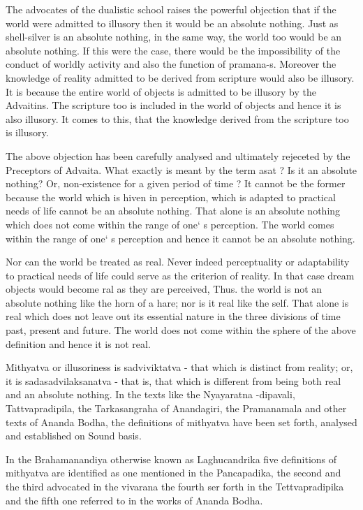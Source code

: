 The advocates of the dualistic school raises the powerful objection that if the world were admitted to illusory then it would be an absolute nothing. Just as shell-silver is an absolute nothing, in the same way, the world too would be an absolute nothing. If this were the case, there would be the impossibility of the conduct of worldly activity and also the function of pramana-s. Moreover the knowledge of reality admitted to be derived from scripture would also be illusory. It is because the entire world of objects is admitted to be illusory by the Advaitins. The scripture too is included in the world of objects and hence it is also illusory. It comes to this, that the knowledge derived from the scripture too is illusory. 

The above objection has been carefully analysed and ultimately rejeceted by the Preceptors of Advaita. What exactly is meant by the term asat ? Is it an absolute nothing? Or, non-existence for a given period of time ? It cannot be the former because the world which is hiven in perception, which is adapted to practical needs of life cannot be an absolute nothing. That alone is an absolute nothing which does not come within the range of one` s perception. The world comes within the range of one` s perception and hence it cannot be an absolute nothing. 

Nor can the world be treated as real. Never indeed perceptuality or adaptability to practical needs of life could serve as the criterion of reality. In that case dream objects would become ral as they are perceived, Thus. the world is not an absolute nothing like the horn of a hare; nor is it real like the self. That alone is real which does not leave out its essential nature in the three divisions of time past, present and future. The world does not come within the sphere of the above definition and hence it is not real. 

Mithyatva or illusoriness is sadviviktatva - that which is distinct from reality; or, it is sadasadvilaksanatva - that is, that which is different from being both real and an absolute nothing. In the texts like the Nyayaratna -dipavali, Tattvapradipila, the Tarkasangraha of Anandagiri, the Pramanamala and other texts of Ananda Bodha, the definitions of mithyatva have been set forth, analysed and established on Sound basis. 

In the Brahamanandiya otherwise known as Laghucandrika five definitions of mithyatva are identified as one mentioned in the Pancapadika, the second and the third advocated in the vivarana the fourth ser forth in the Tettvapradipika and the fifth one referred to in the works of Ananda Bodha.

